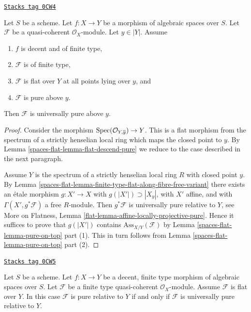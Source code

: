 \begin{lemma}
\label{spaces-flat-lemma-finite-type-flat-pure-along-fibre-is-universal}
\href{https://stacks.math.columbia.edu/tag/0CW4}{\texttt{Stacks tag 0CW4}}

Let $S$ be a scheme. Let $f : X \to Y$ be a morphism of algebraic
spaces over $S$.
Let $\mathcal{F}$ be a quasi-coherent $\mathcal{O}_X$-module.
Let $y \in |Y|$.
Assume
\begin{enumerate}
\item $f$ is decent and of finite type,
\item $\mathcal{F}$ is of finite type,
\item $\mathcal{F}$ is flat over $Y$ at all points lying over $y$, and
\item $\mathcal{F}$ is pure above $y$.
\end{enumerate}
Then $\mathcal{F}$ is universally pure above $y$.
\end{lemma}

\begin{proof}
Consider the morphism $\operatorname{Spec}(\mathcal{O}_{Y, \overline{y}}) \to Y$.
This is a flat morphism from the spectrum of a strictly henselian
local ring which maps the closed point to $y$.
By Lemma \ref{spaces-flat-lemma-flat-descend-pure} we reduce to the case
described in the next paragraph.

\medskip\noindent
Assume $Y$ is the spectrum of a strictly henselian local ring $R$
with closed point $y$.
By Lemma \ref{spaces-flat-lemma-finite-type-flat-along-fibre-free-variant}
there exists an \'etale morphism $g : X' \to X$ with
$g(|X'|) \supset |X_y|$, with $X'$ affine, and with
$\Gamma(X', g^*\mathcal{F})$ a free $R$-module.
Then $g^*\mathcal{F}$ is universally pure relative to $Y$, see
More on Flatness, Lemma \ref{flat-lemma-affine-locally-projective-pure}.
Hence it suffices to prove that
$g(|X'|)$ contains $\text{Ass}_{X/Y}(\mathcal{F})$
by Lemma \ref{spaces-flat-lemma-pure-on-top} part (1).
This in turn follows from
Lemma \ref{spaces-flat-lemma-pure-on-top} part (2).
\end{proof}

\begin{lemma}
\label{spaces-flat-lemma-finite-type-flat-pure-is-universal}
\href{https://stacks.math.columbia.edu/tag/0CW5}{\texttt{Stacks tag 0CW5}}

Let $S$ be a scheme.
Let $f : X \to Y$ be a decent, finite type morphism of algebraic
spaces over $S$.
Let $\mathcal{F}$ be a finite type quasi-coherent $\mathcal{O}_X$-module.
Assume $\mathcal{F}$ is flat over $Y$. In this case
$\mathcal{F}$ is pure relative to $Y$ if and only if $\mathcal{F}$
is universally pure relative to $Y$.
\end{lemma}

